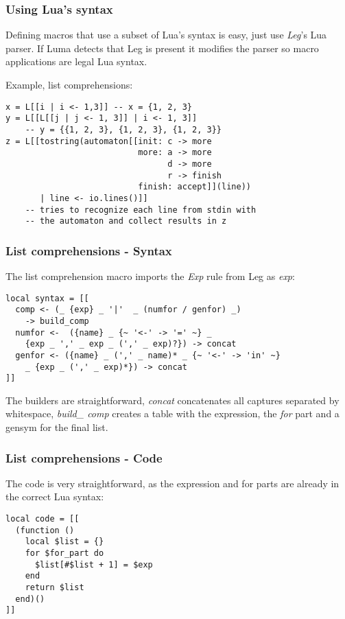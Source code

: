 \documentclass{beamer}
\begin{document}
\begin{frame}[fragile]
\frametitle{Using Lua's syntax}

Defining macros that use a subset of Lua's syntax is easy, just use \emph{Leg}'s Lua parser. If
Luma detects that Leg is present it modifies the parser so macro applications are legal Lua syntax.

Example, list comprehensions:

\begin{verbatim}
x = L[[i | i <- 1,3]] -- x = {1, 2, 3}
y = L[[L[[j | j <- 1, 3]] | i <- 1, 3]] 
    -- y = {{1, 2, 3}, {1, 2, 3}, {1, 2, 3}}
z = L[[tostring(automaton[[init: c -> more 
                           more: a -> more
                                 d -> more
                                 r -> finish
                           finish: accept]](line))
       | line <- io.lines()]]
    -- tries to recognize each line from stdin with
    -- the automaton and collect results in z
\end{verbatim}

\end{frame}

\begin{frame}[fragile]
\frametitle{List comprehensions - Syntax}
The list comprehension macro imports the \emph{Exp} rule from Leg as \emph{exp}:

\begin{verbatim}
local syntax = [[
  comp <- (_ {exp} _ '|'  _ (numfor / genfor) _)
    -> build_comp
  numfor <-  ({name} _ {~ '<-' -> '=' ~} _ 
    {exp _ ',' _ exp _ (',' _ exp)?}) -> concat
  genfor <- ({name} _ (',' _ name)* _ {~ '<-' -> 'in' ~}
    _ {exp _ (',' _ exp)*}) -> concat
]]
\end{verbatim}

The builders are straightforward, \emph{concat} concatenates all captures
separated by whitespace, \emph{build\_ comp} creates a table with the expression,
the \emph{for} part and a gensym for the final list.
\end{frame}

\begin{frame}[fragile]
\frametitle{List comprehensions - Code}
The code is very straightforward, as the expression and for parts are already
in the correct Lua syntax:

\begin{verbatim}
local code = [[
  (function ()
    local $list = {}
    for $for_part do
      $list[#$list + 1] = $exp
    end
    return $list
  end)()
]]
\end{verbatim}
\end{frame}
\end{document}
